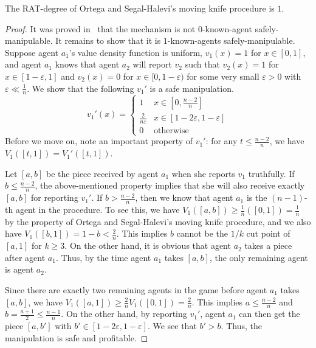 \begin{toappendix}
\begin{theorem}
    The RAT-degree of Ortega and Segal-Halevi's moving knife procedure is $1$.
\end{theorem}
\begin{proof}
    It was proved in~\citet{BU2023Rat} that the mechanism is not $0$-known-agent safely-manipulable.
    It remains to show that it is $1$-known-agents safely-manipulable.
    Suppose agent $a_1$'s value density function is uniform, $v_1(x)=1$ for $x\in[0,1]$, and agent $a_1$ knows that agent $a_2$ will report $v_2$ such that $v_2(x)=1$ for $x\in[1-\varepsilon,1]$ and $v_2(x)=0$ for $x\in[0,1-\varepsilon)$ for some very small $\varepsilon>0$ with $\varepsilon\ll\frac1n$.
    We show that the following $v_1'$ is a safe manipulation.
    $$v_1'(x)=\left\{\begin{array}{ll}
        1 & x\in[0,\frac{n-2}n] \\
        \frac2{n\varepsilon} & x\in[1-2\varepsilon,1-\varepsilon]\\
        0 & \mbox{otherwise}
    \end{array}\right.$$
    Before we move on, note an important property of $v_1'$: for any $t\leq\frac{n-2}n$, we have $V_1([t,1])=V_1'([t,1])$.

    Let $[a,b]$ be the piece received by agent $a_1$ when she reports $v_1$ truthfully.
    If $b\leq \frac{n-2}n$, the above-mentioned property implies that she will also receive exactly $[a,b]$ for reporting $v_1'$.
    If $b>\frac{n-2}n$, then we know that agent $a_1$ is the $(n-1)$-th agent in the procedure.
    To see this, we have $V_1([a,b])\geq\frac1n([0,1])=\frac1n$ by the property of Ortega and Segal-Halevi's moving knife procedure, and we also have $V_1([b,1])=1-b<\frac2n$.
    This implies $b$ cannot be the $1/k$ cut point of $[a,1]$ for $k\geq 3$.
    On the other hand, it is obvious that agent $a_2$ takes a piece after agent $a_1$.
    Thus, by the time agent $a_1$ takes $[a,b]$, the only remaining agent is agent $a_2$.

    Since there are exactly two remaining agents in the game before agent $a_1$ takes $[a,b]$, we have $V_1([a,1])\geq\frac2nV_1([0,1])=\frac2n$.
    This implies $a\leq\frac{n-2}n$ and $b=\frac{a+1}2\leq \frac{n-1}n$.
    On the other hand, by reporting $v_1'$, agent $a_1$ can then get the piece $[a,b']$ with $b'\in[1-2\varepsilon,1-\varepsilon]$.
    We see that $b'>b$. Thus, the manipulation is safe and profitable.
\end{proof}



\end{toappendix}
